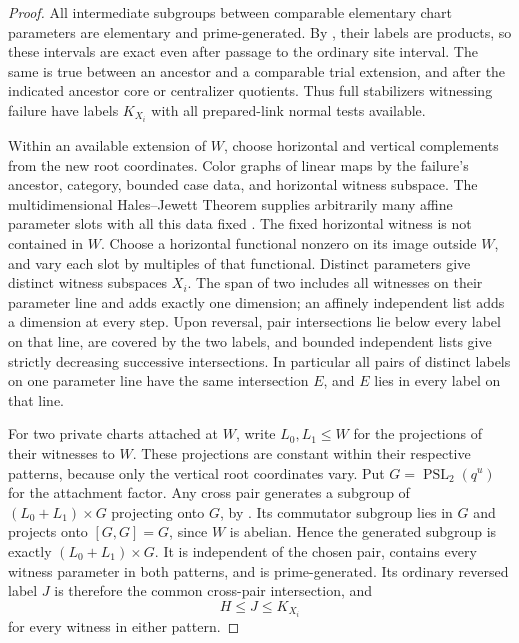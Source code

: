 \begin{proof}
All intermediate subgroups between comparable elementary chart
parameters are elementary and prime-generated.  By
, their labels are products, so these intervals
are exact even after passage to the ordinary site interval.  The
same is true between an ancestor and a comparable trial extension,
and after the indicated ancestor core or centralizer quotients.
Thus full stabilizers witnessing failure have labels $K_{X_i}$
with all prepared-link normal tests available.

Within an available extension of $W$, choose horizontal and vertical
complements from the new root coordinates.  Color graphs of linear
maps by the failure's ancestor, category, bounded case data, and
horizontal witness subspace.  The multidimensional Hales--Jewett Theorem supplies arbitrarily many affine parameter slots with all
this data fixed \citep{HalesJewett1963}.  The fixed horizontal
witness is not contained in $W$.  Choose a horizontal functional
nonzero on its image outside $W$, and vary each slot by multiples
of that functional.  Distinct parameters give distinct witness
subspaces $X_i$.  The span of two includes all witnesses on their
parameter line and adds exactly one dimension; an affinely
independent list adds a dimension at every step.  Upon reversal,
pair intersections lie below every label on that line, are covered
by the two labels, and bounded independent lists give strictly
decreasing successive intersections.  In particular all pairs of
distinct labels on one parameter line have the same intersection $E$,
and $E$ lies in every label on that line.

For two private charts attached at $W$, write $L_0,L_1\le W$ for
the projections of their witnesses to $W$.  These projections are
constant within their respective patterns, because only the vertical
root coordinates vary.  Put $G=\operatorname{PSL}_2(q^u)$ for the
attachment factor.  Any cross pair generates a subgroup of
$(L_0+L_1)\times G$ projecting onto $G$, by
.  Its commutator subgroup lies in $G$ and
projects onto $[G,G]=G$, since $W$ is abelian.  Hence the generated
subgroup is exactly $(L_0+L_1)\times G$.  It is independent of the
chosen pair, contains every witness parameter in both patterns, and
is prime-generated.  Its ordinary reversed label $J$ is therefore
the common cross-pair intersection, and
\[
 H\le J\le K_{X_i}
\]
for every witness in either pattern.


\end{proof}
